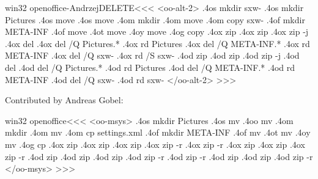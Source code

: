 \documentclass{article}
\begin{document}
\<win32 openoffice-AndrzejDELETE\><<<
<oo-alt-2>
.4os mkdir sxw-%
.4os mkdir Pictures
.4os move  %
.4os move  %
%
.4om mkdir %
.4om move  %
.4om copy  sxw-%
%
.4of mkdir META-INF
.4of move  %
%
.4ot move  %
.4oy move  %
.4og copy  %
.4ox zip   %
.4ox zip   %
.4ox zip -j %
%
.4ox del %
.4ox del /Q Pictures\*.*
.4ox rd Pictures
.4ox del /Q META-INF\*.*
.4ox rd META-INF
.4ox del /Q sxw-%
.4ox rd /S sxw-%
.4od zip %
.4od zip %
.4od zip -j %
%
.4od del %
.4od del /Q Pictures\*.*
.4od rd Pictures
.4od del /Q META-INF\*.*
.4od rd META-INF
.4od del /Q sxw-%
.4od rd sxw-%
</oo-alt-2>
>>>





Contributed by Andreas Gobel:


\<win32 openoffice\><<<
%
%
<oo-msys> 
.4os mkdir Pictures  
.4os mv  %
.4oo mv  %
%  
.4om mkdir %
.4om mv  %
.4om cp  settings.xml %
%  
.4of mkdir META-INF  
.4of mv  %
%  
.4ot mv  %
.4oy mv  %
.4og cp   %
.4ox zip  %
.4ox zip  %
.4ox zip  %
.4ox zip  -r %
.4ox zip  -r %
.4ox zip  %
.4ox zip  %
.4ox zip  -r %
.4od zip  %
.4od zip  %
.4od zip  %
.4od zip  -r %
.4od zip  -r %
.4od zip  %
.4od zip  %
.4od zip  -r %
%  
</oo-msys> 
>>> 
 
\end{document}
